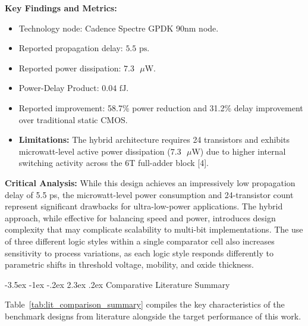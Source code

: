 \documentclass[12pt,a4paper,oneside]{report}
\makeatletter
\renewcommand\section{\@startsection {section}{1}{\z@}%
                                   {-3.5ex \@plus -1ex \@minus -.2ex}%
                                   {2.3ex \@plus.2ex}%
                                   {\normalfont\normalsize\bfseries}}
\makeatother
\begin{document}
\noindent\textbf{Key Findings and Metrics:}
\begin{itemize}
\item Technology node: Cadence Spectre GPDK 90nm node.
\item Reported propagation delay: $5.5\text{ ps}$.
\item Reported power dissipation: $7.3\text{ }\mu\text{W}$.
\item Power-Delay Product: $0.04\text{ fJ}$.
\item Reported improvement: 58.7\% power reduction and 31.2\% delay improvement over traditional static CMOS.
\item \textbf{Limitations:} The hybrid architecture requires 24 transistors and exhibits microwatt-level active power dissipation ($7.3\text{ }\mu\text{W}$) due to higher internal switching activity across the 6T full-adder block [4].
\end{itemize}

\noindent\textbf{Critical Analysis:} While this design achieves an impressively low propagation delay of 5.5 ps, the microwatt-level power consumption and 24-transistor count represent significant drawbacks for ultra-low-power applications. The hybrid approach, while effective for balancing speed and power, introduces design complexity that may complicate scalability to multi-bit implementations. The use of three different logic styles within a single comparator cell also increases sensitivity to process variations, as each logic style responds differently to parametric shifts in threshold voltage, mobility, and oxide thickness.

\section{Comparative Literature Summary}

Table~\ref{tab:lit_comparison_summary} compiles the key characteristics of the benchmark designs from literature alongside the target performance of this work.
\end{document}
